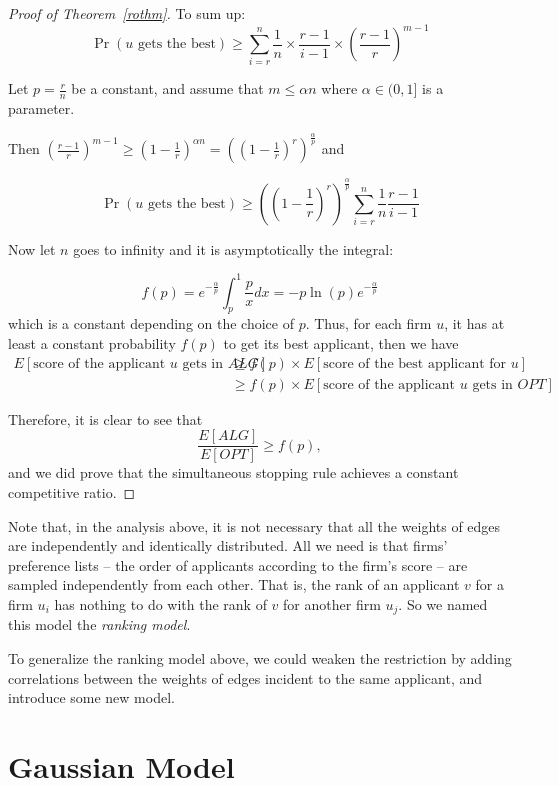 \begin{proof}[Proof of Theorem~\ref{rothm}]
    To sum up:
    $$\Pr(u\text{ gets the best}) \ge \sum_{i=r}^{n} \frac{1}{n} \times \frac{r-1}{i-1} \times \left(\frac{r-1}{r}\right)^{m-1}$$

    Let $p = \frac{r}{n}$ be a constant, and assume that $m \le \alpha n$ where $\alpha \in (0,1]$ is a parameter.

    Then $\left(\frac{r-1}{r}\right)^{m-1} \ge \left(1-\frac{1}{r}\right)^{\alpha n} = \left(\left(1-\frac{1}{r}\right)^{r}\right)^{\frac{\alpha}{p}}$ and

    $$\Pr(u \text{ gets the best}) \ge \left(\left(1 - \frac{1}{r}\right)^r\right)^{\frac{\alpha}{p}} \sum_{i=r}^{n} \frac{1}{n}\frac{r-1}{i-1}$$

    Now let $n$ goes to infinity and it is asymptotically the integral:

    $$f(p) = e^{-\frac{\alpha}{p}} \int_{p}^{1} \frac{p}{x} dx = -p \ln(p) e^{-\frac{\alpha}{p}}$$
    which is a constant depending on the choice of $p$.
    Thus, for each firm $u$, it
    has at least a constant probability $f(p)$ to get its best applicant, then we have
    \begin{align*}
        E[\text{score of the applicant }u\text{ gets in }ALG]
        & \ge f(p) \times E[\text{score of the best applicant for }u] \\
        & \ge f(p) \times E[\text{score of the applicant }u\text{ gets in }OPT]
    \end{align*}

    Therefore, it is clear to see that
    \[ \frac{E[ALG]}{E[OPT]} \ge f(p), \]
    and we did prove that the simultaneous stopping rule
    achieves a constant competitive ratio.
\end{proof}

Note that, in the analysis above, it is not necessary that all the weights
of edges are independently and identically distributed.
All we need is that firms' preference lists -- the order of applicants
according to the firm's score -- are sampled independently from each other.
That is, the rank of an applicant $v$ for a firm $u_i$ has nothing to do
with the rank of $v$ for another firm $u_j$.
So we named this model the \emph{ranking model}.

To generalize the ranking model above, we could weaken the restriction by
adding correlations between the weights of edges incident to
the same applicant, and introduce some new model.

\section{Gaussian Model}

